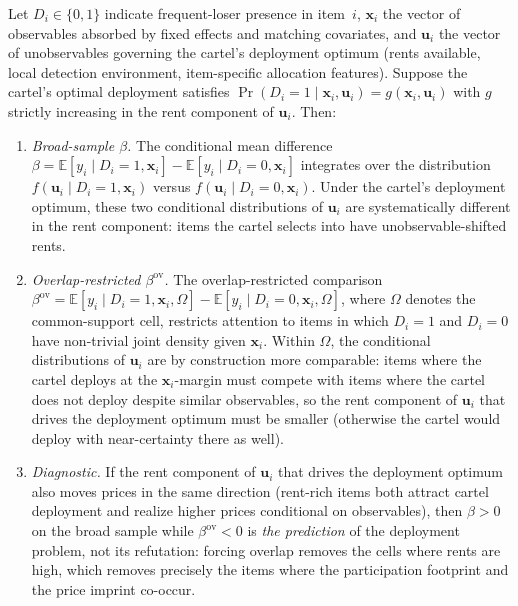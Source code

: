 \begin{proposition}\label{prop:screening_value}
Let $D_i \in \{0,1\}$ indicate frequent-loser presence in
item~$i$, $\mathbf{x}_i$ the vector of observables absorbed by
fixed effects and matching covariates, and $\mathbf{u}_i$ the
vector of unobservables governing the cartel's deployment
optimum (rents available, local detection environment,
item-specific allocation features). Suppose the cartel's
optimal deployment satisfies
$\Pr(D_i=1 \mid \mathbf{x}_i, \mathbf{u}_i)
= g(\mathbf{x}_i, \mathbf{u}_i)$ with $g$ strictly increasing in
the rent component of $\mathbf{u}_i$. Then:
\begin{enumerate}
\item \emph{Broad-sample $\beta$.} The conditional mean
difference
$\beta = \mathbb{E}[y_i \mid D_i=1, \mathbf{x}_i] -
        \mathbb{E}[y_i \mid D_i=0, \mathbf{x}_i]$
integrates over the distribution
$f(\mathbf{u}_i \mid D_i = 1, \mathbf{x}_i)$ versus
$f(\mathbf{u}_i \mid D_i = 0, \mathbf{x}_i)$. Under the cartel's
deployment optimum, these two conditional distributions of
$\mathbf{u}_i$ are systematically different in the rent
component: items the cartel selects into have
unobservable-shifted rents.
\item \emph{Overlap-restricted $\beta^{\text{ov}}$.} The
overlap-restricted comparison
$\beta^{\text{ov}} = \mathbb{E}[y_i \mid D_i=1, \mathbf{x}_i,
\Omega] - \mathbb{E}[y_i \mid D_i=0, \mathbf{x}_i, \Omega]$,
where $\Omega$ denotes the common-support cell, restricts
attention to items in which $D_i=1$ and $D_i=0$ have non-trivial
joint density given $\mathbf{x}_i$. Within $\Omega$, the
conditional distributions of $\mathbf{u}_i$ are by construction
more comparable: items where the cartel deploys at the
$\mathbf{x}_i$-margin must compete with items where the cartel
does not deploy despite similar observables, so the rent
component of $\mathbf{u}_i$ that drives the deployment optimum
must be smaller (otherwise the cartel would deploy with
near-certainty there as well).
\item \emph{Diagnostic.} If the rent component of $\mathbf{u}_i$
that drives the deployment optimum also moves prices in the same
direction (rent-rich items both attract cartel deployment and
realize higher prices conditional on observables), then
$\beta>0$ on the broad sample while $\beta^{\text{ov}}<0$ is
\emph{the prediction} of the deployment problem, not its
refutation: forcing overlap removes the cells where rents are
high, which removes precisely the items where the participation
footprint and the price imprint co-occur.
\end{enumerate}
\end{proposition}

